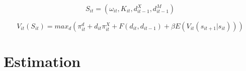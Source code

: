 \documentclass[11pt]{article}
\begin{document}
$$ S_{it} = (\omega_{it}, K_{it}, d_{it-1}^{X}, d_{it-1}^{M})$$

\begin{equation}
V_{it}(S_{it}) = max_d(\pi_{it}^{d} +d_{it}\pi_{it}^{X} + F(d_{it}, d_{it-1}) + \beta E(V_{it}(s_{it+1}|s_{it})))
\end{equation}






 




\section{Estimation}
\printbibliography[omitnumbers=false]
\end{document}
